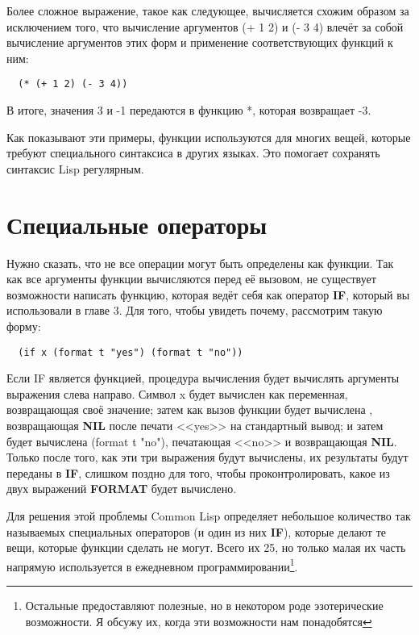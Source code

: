 Более сложное выражение, такое как следующее, вычисляется схожим образом за исключением
того, что вычисление аргументов (+ 1 2) и (- 3 4) влечёт за собой вычисление аргументов
этих форм и применение соответствующих функций к ним:

\begin{lstlisting}
  (* (+ 1 2) (- 3 4))
\end{lstlisting}

В итоге, значения 3 и -1 передаются в функцию *, которая возвращает -3.

Как показывают эти примеры, функции используются для многих вещей, которые требуют
специального синтаксиса в других языках. Это помогает сохранять синтаксис Lisp регулярным.

\section{Специальные операторы}

Нужно сказать, что не все операции могут быть определены как функции. Так как все
аргументы функции вычисляются перед её вызовом, не существует возможности написать
функцию, которая ведёт себя как оператор \textbf{IF}, который вы использовали в главе
3. Для того, чтобы увидеть почему, рассмотрим такую форму:

\begin{lstlisting}
  (if x (format t "yes") (format t "no"))
\end{lstlisting}

Если IF является функцией, процедура вычисления будет вычислять аргументы выражения слева
направо. Символ x будет вычислен как переменная, возвращающая своё значение; затем как
вызов функции будет вычислена , возвращающая \textbf{NIL} после
печати <<yes>> на стандартный вывод; и затем будет вычислена (format t "no"), печатающая
<<no>> и возвращающая \textbf{NIL}. Только после того, как эти три выражения будут
вычислены, их результаты будут переданы в \textbf{IF}, слишком поздно для того, чтобы
проконтролировать, какое из двух выражений \textbf{FORMAT} будет вычислено.

Для решения этой проблемы Common Lisp определяет небольшое количество так называемых
специальных операторов (и один из них \textbf{IF}), которые делают те вещи, которые
функции сделать не могут. Всего их 25, но только малая их часть напрямую используется в
ежедневном программировании\footnote{Остальные предоставляют полезные, но в некотором роде
  эзотерические возможности. Я обсужу их, когда эти возможности нам понадобятся}.

